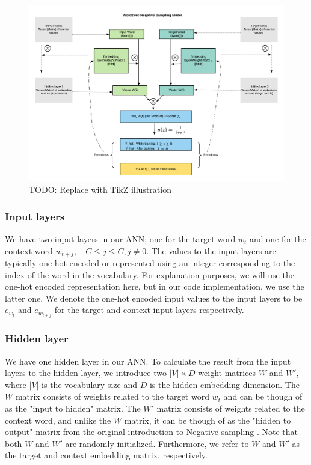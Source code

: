 \begin{figure}[ht]
    \centering
    \includegraphics[width=15cm]{thesis/figures/word2vec-skip-gram-negative-sampling.png}
    \caption{TODO: Replace with TikZ illustration}
    \label{fig:word2vec-skip-gram-negative-sampling}
\end{figure}

\subsubsection{Input layers}
We have two input layers in our ANN; one for the target word $w_t$ and one for the context word $w_{t+j}$, $-C \leq j \leq C, j \neq 0$. The values to the input layers are typically one-hot encoded or represented using an integer corresponding to the index of the word in the vocabulary. For explanation purposes, we will use the one-hot encoded representation here, but in our code implementation, we use the latter one. We denote the one-hot encoded input values to the input layers to be $e_{w_t}$ and $e_{w_{t+j}}$ for the target and context input layers respectively.

\subsubsection{Hidden layer}
We have one hidden layer in our ANN. To calculate the result from the input layers to the hidden layer, we introduce two $|V| \times D$ weight matrices $W$ and $W'$, where $|V|$ is the vocabulary size and $D$ is the hidden embedding dimension. The $W$ matrix consists of weights related to the target word $w_t$ and can be though of as the "input to hidden" matrix. The $W'$ matrix consists of weights related to the context word, and unlike the $W$ matrix, it can be though of as the "hidden to output" matrix from the original introduction to Negative sampling \cite{mikolov2013b}. Note that both $W$ and $W'$ are randomly initialized. Furthermore, we refer to $W$ and $W'$ as the target and context embedding matrix, respectively.

